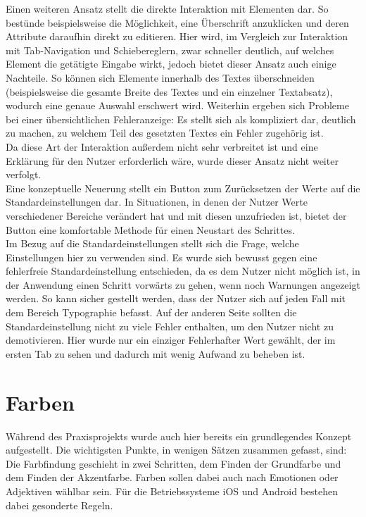 Einen weiteren Ansatz stellt die direkte Interaktion mit Elementen dar. So bestünde beispielsweise die Möglichkeit, eine Überschrift anzuklicken und deren Attribute daraufhin direkt zu editieren. Hier wird, im Vergleich zur Interaktion mit Tab-Navigation und Schiebereglern, zwar schneller deutlich, auf welches Element die getätigte Eingabe wirkt, jedoch bietet dieser Ansatz auch einige Nachteile. So können sich Elemente innerhalb des Textes überschneiden (beispielsweise die gesamte Breite des Textes und ein einzelner Textabsatz), wodurch eine genaue Auswahl erschwert wird. Weiterhin ergeben sich Probleme bei einer übersichtlichen Fehleranzeige: Es stellt sich als kompliziert dar, deutlich zu machen, zu welchem Teil des gesetzten Textes ein Fehler zugehörig ist.\\
Da diese Art der Interaktion außerdem nicht sehr verbreitet ist und eine Erklärung für den Nutzer erforderlich wäre, wurde dieser Ansatz nicht weiter verfolgt.\\

Eine konzeptuelle Neuerung stellt ein Button zum Zurücksetzen der Werte auf die Standardeinstellungen dar. In Situationen, in denen der Nutzer Werte verschiedener Bereiche verändert hat und mit diesen unzufrieden ist, bietet der Button eine komfortable Methode für einen Neustart des Schrittes.\\
Im Bezug auf die Standardeinstellungen stellt sich die Frage, welche Einstellungen hier zu verwenden sind. Es wurde sich bewusst gegen eine fehlerfreie Standardeinstellung entschieden, da es dem Nutzer nicht möglich ist, in der Anwendung einen Schritt vorwärts zu gehen, wenn noch Warnungen angezeigt werden. So kann sicher gestellt werden, dass der Nutzer sich auf jeden Fall mit dem Bereich Typographie befasst.
Auf der anderen Seite sollten die Standardeinstellung nicht zu viele Fehler enthalten, um den Nutzer nicht zu demotivieren. Hier wurde nur ein einziger Fehlerhafter Wert gewählt, der im ersten Tab zu sehen und dadurch mit wenig Aufwand zu beheben ist.\\

\section{Farben}
Während des Praxisprojekts wurde auch hier bereits ein grundlegendes Konzept aufgestellt. Die wichtigsten Punkte, in wenigen Sätzen zusammen gefasst, sind:\\
Die Farbfindung geschieht in zwei Schritten, dem Finden der Grundfarbe und dem Finden der Akzentfarbe. Farben sollen dabei auch nach Emotionen oder Adjektiven wählbar sein. Für die Betriebssysteme iOS und Android bestehen dabei gesonderte Regeln. \cite{PoplawskiPP}

